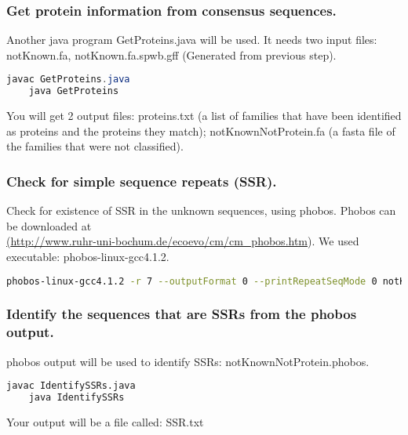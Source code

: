 \documentclass[a4paper,12pt]{article}
\begin{document}
	\pagebreak
	
	\subsubsection{Get protein information from consensus sequences.}
	Another java program GetProteins.java will be used. It needs two input files: notKnown.fa, notKnown.fa.spwb.gff (Generated from previous step).
	\begin{lstlisting}[language=java]
	javac GetProteins.java
	java GetProteins \end{lstlisting}
	You will get 2 output files: proteins.txt (a list of families that have been identified as proteins and the proteins they match);
	notKnownNotProtein.fa (a fasta file of the families that were not classified).
	
	\subsubsection{Check for simple sequence repeats (SSR).}
	Check for existence of SSR in the unknown sequences, using phobos. Phobos can be downloaded at \\ \href{<url>}(\url{http://www.ruhr-uni-bochum.de/ecoevo/cm/cm_phobos.htm}). We used executable: phobos-linux-gcc4.1.2.\\
	
	\begin{lstlisting}[language=bash]
	phobos-linux-gcc4.1.2 -r 7 --outputFormat 0 --printRepeatSeqMode 0 notKnownNotProtein.fa > notKnownNotProtein.phobos \end{lstlisting}
	
	\subsubsection{Identify the sequences that are SSRs from the phobos output.}
	phobos output will be used to identify SSRs: notKnownNotProtein.phobos.
	\begin{lstlisting}[language=bash]
	javac IdentifySSRs.java
	java IdentifySSRs \end{lstlisting}
	Your output will be a file called: SSR.txt
	
\end{document}
